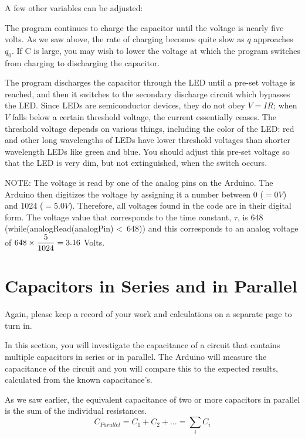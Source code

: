 \documentclass[]{article}
\begin{document}
A few other variables can be adjusted:  

The program continues to charge the capacitor until the voltage is nearly five volts.   As we saw above, the rate of charging becomes quite slow as $q$ approaches $q_0$.  If C is large, you may wish to lower the voltage at which the program switches from charging to discharging the capacitor.

The program discharges the capacitor through the LED until a pre-set voltage is reached, and then it switches to the secondary discharge circuit which bypasses the LED.  Since LEDs are semiconductor devices, they do not obey $V=IR$; when $V$ falls below a certain threshold voltage, the current essentially ceases.  The threshold voltage depends on various things, including the color of the LED: red and other long wavelengths of LEDs have lower threshold voltages than shorter wavelength LEDs like green and blue.  You should adjust this pre-set voltage so that the LED is very dim, but not extinguished, when the switch occurs.

NOTE: The voltage is read by one of the analog pins on the Arduino.  The Arduino then digitizes the voltage by assigning it a number between 0 ($=0V$) and 1024 ($=5.0V$).  Therefore, all voltages found in the code are in their digital form.  The voltage value that corresponds to the time constant, $\tau$, is 648 (while(analogRead(analogPin) \textless \ 648)) and this corresponds to an analog voltage of $\displaystyle 648 \times \frac{5}{1024} = 3.16$ Volts.



\section{Capacitors in Series and in Parallel}
Again, please keep a record of your work and  calculations on a separate page to turn in.

In this section, you will investigate the capacitance of a circuit that contains multiple capacitors in series or in parallel.  The Arduino will measure the capacitance of the circuit and you will compare this to the expected results, calculated from the known capacitance's.

As we saw earlier, the equivalent capacitance of two or more capacitors in parallel is the sum of the individual resistances.
\begin{equation*}
C_{Parallel} = C_1 + C_2 +\dots = \sum_i C_i
\end{equation*}
\end{document}
